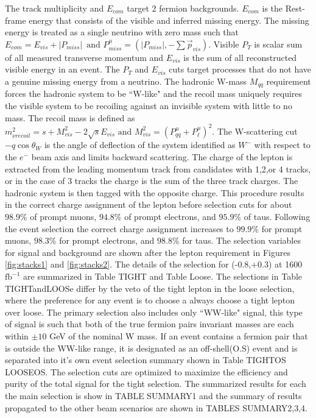 The track multiplicity and $E_{com}$ target 2 fermion backgrounds. $E_{com}$ is the Rest-frame energy that consists of the visible and inferred missing energy. The missing energy is treated as a single neutrino with zero mass such that $E_{com} = E_{vis} + |P_{miss}| \, \,  \, \text{and} \, \, P^\mu_{miss} = (|P_{miss}| , -\sum{\vec{p}_{vis}})$. Visible $P_T$ is scalar sum of all measured transverse momentum and $E_{vis}$ is the sum of all reconstructed visible energy in an event. The $P_T$ and $E_{vis}$ cuts target processes that do not have a genuine missing energy from a neutrino. The hadronic W-mass $M_{qq}$ requirement forces the hadronic system to be ``W-like" and the recoil mass uniquely requires the visible system to be recoiling against an invisible system with little to no mass. The recoil mass is defined as $m^2_{\nu recoil} = s + M^2_{vis} - 2\sqrt{s}E_{vis} \, \, \text{and} \, \, M^2_{vis} = ( P^{\mu}_{qq} +  P^{\mu}_{\ell})^2$. The W-scattering cut $-q\cos\theta_W$ is the angle of deflection of the system identified as $W^-$ with respect to the $e^-$ beam axis and limits backward scattering.  The charge of the lepton is extracted from the leading momentum track from candidates with 1,2,or 4 tracks, or in the case of 3 tracks the charge is the sum of the three track charges. The hadronic system is then tagged with the opposite charge.  This procedure results in the correct charge assignment of the lepton before selection cuts for about $98.9\%$ of prompt muons, $94.8\%$ of prompt electrons, and $95.9\%$ of taus. Following the event selection the correct charge assignment increases to $99.9\%$ for prompt muons, $98.3\%$ for prompt electrons, and $98.8\%$ for taus. The selection variables for signal and background are shown after the lepton requirement in Figures \ref{fig:stacks1} and \ref{fig:stacks2}.  The details of the selection for (-0.8,+0.3) at 1600$\text{fb}^{-1}$ are summarized in Table TIGHT and Table Loose. The selections in Table TIGHTandLOOSe differ by the veto of the tight lepton in the loose selection, where the preference for any event is to choose a always choose a tight lepton over loose. The primary selection also includes only ``WW-like" signal, this type of signal is such that both of the true fermion pairs invariant masses are each within $\pm10$ GeV of the nominal W mass. If an event contains a fermion pair that is outside the WW-like range, it is designated as an off-shell(O.S) event and is separated into it's own event selection summary shown in Table TIGHTOS LOOSEOS. The selection cuts are optimized to maximize the efficiency and purity of the total signal for the tight selection. The summarized results for each the main selection is show in TABLE SUMMARY1 and the summary of results propagated to the other beam scenarios are shown in TABLES SUMMARY2,3,4.
